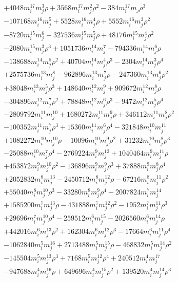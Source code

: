 {\begin{align*}
&+4048m_i^{17}m_j^{3}\rho+3568m_i^{17}m_j^{2}\rho^{2}-384m_i^{17}m_j\rho^{3}\\
&-107168m_i^{16}m_j^{5}+5528m_i^{16}m_j^{4}\rho+5552m_i^{16}m_j^{3}\rho^{2}\\
&-8720m_i^{15}m_j^{6}-327536m_i^{15}m_j^{5}\rho+48176m_i^{15}m_j^{4}\rho^{2}\\
&-2080m_i^{15}m_j^{3}\rho^{3}+1051736m_i^{14}m_j^{7}-794336m_i^{14}m_j^{6}\rho\\
&-138688m_i^{14}m_j^{5}\rho^{2}+40704m_i^{14}m_j^{4}\rho^{3}-2304m_i^{14}m_j^{3}\rho^{4}\\
&+2575736m_i^{13}m_j^{8}-962896m_i^{13}m_j^{7}\rho-247360m_i^{13}m_j^{6}\rho^{2}\\
&+38048m_i^{13}m_j^{5}\rho^{3}+148640m_i^{12}m_j^{9}+909672m_i^{12}m_j^{8}\rho\\
&-304896m_i^{12}m_j^{7}\rho^{2}+78848m_i^{12}m_j^{6}\rho^{3}-9472m_i^{12}m_j^{5}\rho^{4}\\
&-2809792m_i^{11}m_j^{10}+1680272m_i^{11}m_j^{9}\rho+346112m_i^{11}m_j^{8}\rho^{2}\\
&-100352m_i^{11}m_j^{7}\rho^{3}+15360m_i^{11}m_j^{6}\rho^{4}-321848m_i^{10}m_j^{11}\\
&+1082272m_i^{10}m_j^{10}\rho-10096m_i^{10}m_j^{9}\rho^{2}+31232m_i^{10}m_j^{8}\rho^{3}\\
&-25088m_i^{10}m_j^{7}\rho^{4}-2769224m_i^{9}m_j^{12}+1040464m_i^{9}m_j^{11}\rho\\
&+453872m_i^{9}m_j^{10}\rho^{2}-136896m_i^{9}m_j^{9}\rho^{3}+37888m_i^{9}m_j^{8}\rho^{4}\\
&+2052832m_i^{8}m_j^{13}-2450712m_i^{8}m_j^{12}\rho-67216m_i^{8}m_j^{11}\rho^{2}\\
&+55040m_i^{8}m_j^{10}\rho^{3}-33280m_i^{8}m_j^{9}\rho^{4}-2007824m_i^{7}m_j^{14}\\
&+1585200m_i^{7}m_j^{13}\rho-431888m_i^{7}m_j^{12}\rho^{2}-1952m_i^{7}m_j^{11}\rho^{3}\\
&+29696m_i^{7}m_j^{10}\rho^{4}-259512m_i^{6}m_j^{15}-2026560m_i^{6}m_j^{14}\rho\\
&+442016m_i^{6}m_j^{13}\rho^{2}+162304m_i^{6}m_j^{12}\rho^{3}-17664m_i^{6}m_j^{11}\rho^{4}\\
&-1062840m_i^{5}m_j^{16}+2713488m_i^{5}m_j^{15}\rho-468832m_i^{5}m_j^{14}\rho^{2}\\
&-145504m_i^{5}m_j^{13}\rho^{3}+7168m_i^{5}m_j^{12}\rho^{4}+240512m_i^{4}m_j^{17}\\
&-947688m_i^{4}m_j^{16}\rho+649696m_i^{4}m_j^{15}\rho^{2}+139520m_i^{4}m_j^{14}\rho^{3}\\

\end{align*}}
